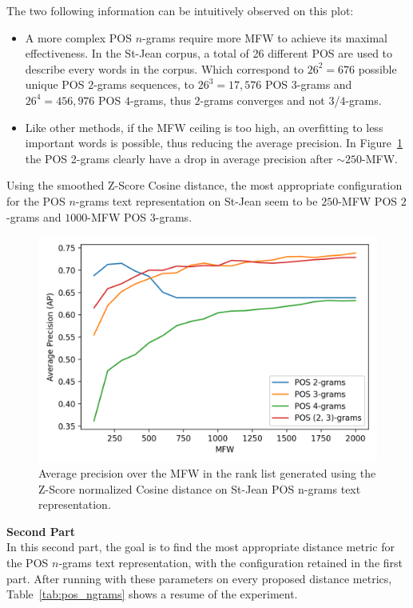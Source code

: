 The two following information can be intuitively observed on this plot:
\begin{itemize}
  \item
  A more complex POS $n$-grams require more MFW to achieve its maximal effectiveness.
  In the St-Jean corpus, a total of 26 different POS are used to describe every words in the corpus.
  Which correspond to $26^2 = 676$ possible unique POS $2$-grams sequences, to $26^3 = 17,576$ POS $3$-grams and $26^4 = 456,976$ POS $4$-grams, thus $2$-grams converges and not $3$/$4$-grams.
  \item
  Like other methods, if the MFW ceiling is too high, an overfitting to less important words is possible, thus reducing the average precision.
  In Figure~\ref{fig:pos_ngrams} the POS 2-grams clearly have a drop in average precision after $\sim 250$-MFW.
\end{itemize}

Using the smoothed Z-Score Cosine distance, the most appropriate configuration for the POS $n$-grams text representation on St-Jean seem to be $250$-MFW POS $2$-grams and $1000$-MFW POS $3$-grams.

\begin{figure}
  \centering
  \caption{Average precision over the MFW in the rank list generated using the Z-Score normalized Cosine distance on St-Jean POS n-grams text representation.}
  \label{fig:pos_ngrams}
  \includegraphics[width=\linewidth]{img/pos_ngrams.png}
\end{figure}

\textbf{Second Part}\\
In this second part, the goal is to find the most appropriate distance metric for the POS $n$-grams text representation, with the configuration retained in the first part.
After running with these parameters on every proposed distance metrics, Table~\ref{tab:pos_ngrams} shows a resume of the experiment.

